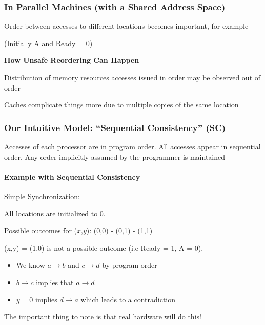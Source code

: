 \subsubsection{In Parallel Machines (with a Shared Address Space)}
\par Order between accesses to different locations becomes important, for example
\begin{center}
    (Initially A and Ready = 0)
\end{center}
\par {\large \textbf{How Unsafe Reordering Can Happen}}
\par Distribution of memory resources accesses issued in order may be observed out of order
%
\clearpage
%
\par Caches complicate things more due to multiple copies of the same location
\subsubsection{Our Intuitive Model: \enquote{Sequential Consistency} (SC)}
\par Accesses of each processor are in program order. All accesses appear in sequential order. Any order implicitly assumed by the programmer is maintained
\paragraph{Example with Sequential Consistency}
\par Simple Synchronization:
\begin{center}
    All locations are initialized to 0.
\end{center}
\par Possible outcomes for ($x$,$y$): (0,0) - (0,1) - (1,1)
\par (x,y) = (1,0) is not a possible outcome (i.e Ready = 1, A = 0).
\begin{itemize}
    \item We know $a\rightarrow b$ and $c\rightarrow d$ by program order
    \item $b\rightarrow c$ implies that $a\rightarrow d$
    \item $y=0$ implies $d\rightarrow a$ which leads to a contradiction
\end{itemize}
\par The important thing to note is that real hardware will do this!
%
\clearpage
%
